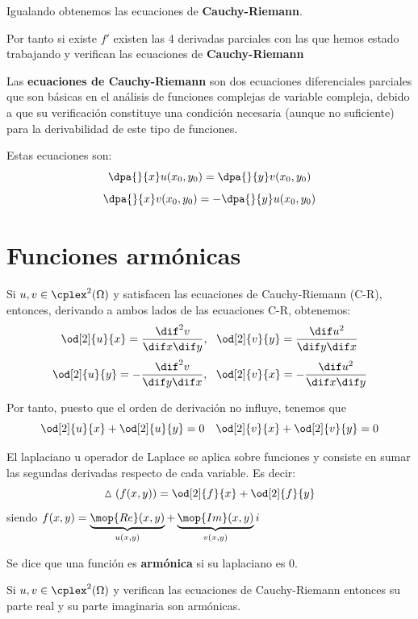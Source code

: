 \documentclass{apuntes}
\begin{document}
Igualando obtenemos las ecuaciones de \textbf{Cauchy-Riemann}.

Por tanto si existe $f'$ existen las 4 derivadas parciales con las que hemos estado trabajando y verifican las ecuaciones de \textbf{Cauchy-Riemann}

\begin{defn}
Las \textbf{ecuaciones de Cauchy-Riemann} son dos ecuaciones diferenciales parciales que son básicas en el análisis de funciones complejas de variable compleja, debido a que su verificación constituye una condición necesaria (aunque no suficiente) para la derivabilidad de este tipo de funciones.

Estas ecuaciones son:
\[\dpa{}{x}u(x_0,y_0) = \dpa{}{y}v(x_0,y_0)\]
\[\dpa{}{x}v(x_0,y_0) = -\dpa{}{y}u(x_0,y_0)\]
\end{defn}

\section{Funciones armónicas}

Si $u,v\in \cplex^2(\Omega)$ y satisfacen las ecuaciones de Cauchy-Riemann (C-R), entonces, derivando a ambos lados de las ecuaciones C-R, obtenemos:
\[\od[2]{u}{x}= \frac{\dif^2 v}{\dif x \dif y}, \ \ \od[2]{v}{y}= \frac{\dif u^2}{\dif y \dif x} \]
\[\od[2]{u}{y}=-\frac{\dif^2 v}{\dif y \dif x}, \ \ \od[2]{v}{x}=-\frac{\dif u^2}{\dif x \dif y} \]

Por tanto, puesto que el orden de derivación no influye, tenemos que
\[\od[2]{u}{x}+\od[2]{u}{y} = 0 \quad \od[2]{v}{x}+\od[2]{v}{y} = 0\]

\newpage
\begin{defn}[Laplaciano]
El laplaciano u operador de Laplace se aplica sobre funciones y consiste en sumar las segundas derivadas respecto de cada variable. Es decir:
\[\vartriangle (f(x,y)) = \od[2]{f}{x}+\od[2]{f}{y}\]
siendo $f(x,y)=\underbrace{\mop{Re}(x,y)}_{u(x,y)}+\underbrace{\mop{Im}(x,y)}_{v(x,y)}i$
\end{defn}

\begin{defn}
Se dice que una función es \textbf{armónica} si su laplaciano es 0.
\end{defn}

\begin{prop}
Si $u,v \in \cplex^2(\Omega)$ y verifican las ecuaciones de Cauchy-Riemann entonces su parte real y su parte imaginaria son armónicas.
\end{prop}
\end{document}
